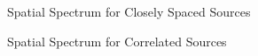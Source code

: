 \documentclass[conference]{IEEEtran}
\begin{document}
		\begin{figure}[H]
			\centerline{}
			\caption{Spatial Spectrum for Closely Spaced Sources}
		\end{figure}
		
		\begin{figure}[H]
			\centerline{}
			\caption{Spatial Spectrum for Correlated Sources}
		\end{figure}
		
\end{document}
